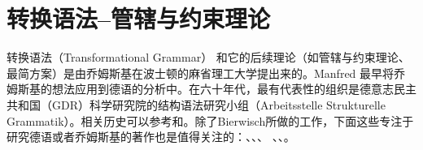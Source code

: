 
\chapter{转换语法--管辖与约束理论}
\label{Kapitel-GB}\label{chap-GB}\label{chap-gb}

转换语法（Transformational Grammar） 和它的后续理论（如管辖与约束理论、最简方案）是由乔姆斯基在波士顿的麻省理工大学提出来的\citep{Chomsky57a,Chomsky65a,Chomsky75a,Chomsky81a,Chomsky86b,Chomsky95a-u}。Manfred \citet{Bierwisch63} 最早将乔姆斯基的想法应用到德语的分析中。在六十年代，最有代表性的组织是德意志民主共和国（GDR）科学研究院的结构语法研究小组（Arbeitsstelle Strukturelle Grammatik）。相关历史可以参考\citealp{Bierwisch92}和\citealp{Vater2010a}。除了Bierwisch所做的工作，下面这些专注于研究德语或者乔姆斯基的著作也是值得关注的：、、、
、、。

